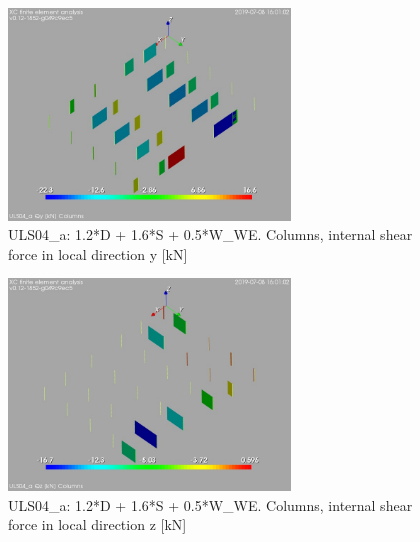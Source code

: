 \begin{figure}
\begin{center}
\includegraphics[width=75mm]{annex_res_columns/graphics/resSimplLC/ULS04_acolumnsQy}
\caption{ULS04\_a: 1.2*D + 1.6*S + 0.5*W\_WE. Columns, internal shear force in local direction y [kN]}
\end{center}
\end{figure}
\begin{figure}
\begin{center}
\includegraphics[width=75mm]{annex_res_columns/graphics/resSimplLC/ULS04_acolumnsQz}
\caption{ULS04\_a: 1.2*D + 1.6*S + 0.5*W\_WE. Columns, internal shear force in local direction z [kN]}
\end{center}
\end{figure}

